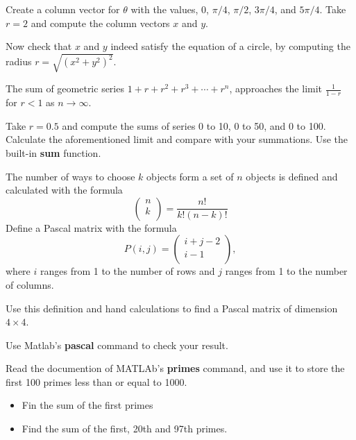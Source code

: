 \documentclass[12pt]{TDTP}
\begin{document}
Create a column vector for $\theta$ with the values, $0$, $\pi/4$, $\pi/2$, $3\pi/4$, and $5\pi/4$.
Take $r=2$ and compute the column vectors $x$ and $y$.

Now check that $x$ and $y$ indeed satisfy the equation of a circle, by computing the radius $r=\sqrt{(x^2+y^2)^2}$.

\Exo
The sum of geometric series $1+r+r^2+r^3 + \cdots + r^n$, approaches the limit $\frac{1}{1-r}$ for $r<1$ as $n\rightarrow \infty$.

Take $r=0.5$ and compute the sums of series 0 to 10, 0 to 50, and 0 to 100.
Calculate the aforementioned limit and compare with your summations. Use the built-in \textbf{sum} function.

\Exo
The number of ways to choose $k$ objects form a set of $n$ objects is defined and calculated with the formula
$$
\begin{pmatrix}
n\\k\\
\end{pmatrix}
= \dfrac{n!}{k!(n-k)!}
$$
Define a Pascal matrix with the formula 
$$
P(i,j) = \begin{pmatrix} i+j-2 \\ i-1\\ \end{pmatrix},
$$
where $i$ ranges from 1 to the number of rows and $j$ ranges from 1 to the number of columns.

Use this definition and hand calculations to find a Pascal matrix of dimension $4\times 4$.

Use Matlab's \textbf{pascal} command to check your result. 

\Exo
Read the documention of MATLAb's \textbf{primes} command, and use it to store the first 100 primes less than or equal to 1000.
\begin{itemize}
\item Fin the sum of the first primes
\item Find the sum of the first, 20th and 97th primes.
\end{itemize}
\end{document}
